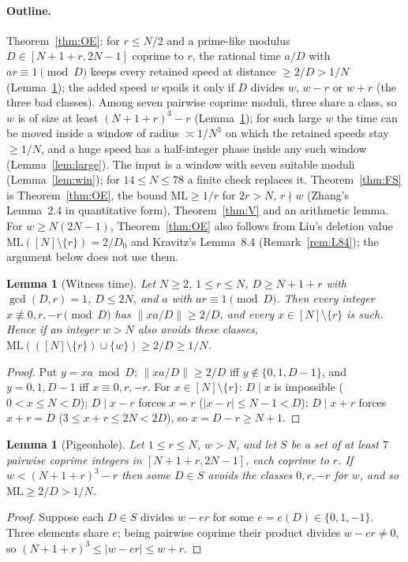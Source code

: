 \documentclass[11pt]{article}
\newtheorem{lemma}[theorem]{Lemma}
\theoremstyle{definition}
\theoremstyle{remark}
\newcommand{\nd}[1]{\lVert #1\rVert}
\newcommand{\ML}{\mathrm{ML}}
\begin{document}
\paragraph{Outline.}
Theorem~\ref{thm:OE}: for $r\le N/2$ and a prime-like modulus $D\in[N+1+r,2N-1]$ coprime to $r$, the rational time $a/D$ with $ar\equiv1\pmod D$ keeps every retained speed at distance $\ge2/D>1/N$ (Lemma~\ref{lem:wit}); the added speed $w$ spoils it only if $D$ divides $w$, $w-r$ or $w+r$ (the three bad classes). Among seven pairwise coprime moduli, three share a class, so $w$ is of size at least $(N+1+r)^3-r$ (Lemma~\ref{lem:pig}); for such large $w$ the time can be moved inside a window of radius $\asymp1/N^3$ on which the retained speeds stay $\ge1/N$, and a huge speed has a half-integer phase inside any such window (Lemma~\ref{lem:large}). The input is a window with seven suitable moduli (Lemma~\ref{lem:win}); for $14\le N\le78$ a finite check replaces it. Theorem~\ref{thm:FS} is Theorem~\ref{thm:OE}, the bound $\ML\ge1/r$ for $2r>N$, $r\nmid w$ (Zhang's Lemma~2.4 in quantitative form), Theorem~\ref{thm:V} and an arithmetic lemma. For $w\ge N(2N-1)$, Theorem~\ref{thm:OE} also follows from Liu's deletion value $\ML([N]\setminus\{r\})=2/D_0$ and Kravitz's Lemma~8.4 (Remark~\ref{rem:L84}); the argument below does not use them.

\begin{lemma}[Witness time]\label{lem:wit}
Let $N\ge2$, $1\le r\le N$, $D\ge N+1+r$ with $\gcd(D,r)=1$, $D\le2N$, and $a$ with $ar\equiv1\pmod D$. Then every integer $x\not\equiv0,r,-r\pmod D$ has $\nd{xa/D}\ge2/D$, and every $x\in[N]\setminus\{r\}$ is such. Hence if an integer $w>N$ also avoids these classes, $\ML(([N]\setminus\{r\})\cup\{w\})\ge2/D\ge1/N$.
\end{lemma}
\begin{proof}
Put $y=xa\bmod D$; $\nd{xa/D}\ge2/D$ iff $y\notin\{0,1,D-1\}$, and $y=0,1,D-1$ iff $x\equiv0,r,-r$. For $x\in[N]\setminus\{r\}$: $D\mid x$ is impossible ($0<x\le N<D$); $D\mid x-r$ forces $x=r$ ($|x-r|\le N-1<D$); $D\mid x+r$ forces $x+r=D$ ($3\le x+r\le2N<2D$), so $x=D-r\ge N+1$.
\end{proof}

\begin{lemma}[Pigeonhole]\label{lem:pig}
Let $1\le r\le N$, $w>N$, and let $S$ be a set of at least $7$ pairwise coprime integers in $[N+1+r,2N-1]$, each coprime to $r$. If $w<(N+1+r)^3-r$ then some $D\in S$ avoids the classes $0,r,-r$ for $w$, and so $\ML\ge2/D>1/N$.
\end{lemma}
\begin{proof}
Suppose each $D\in S$ divides $w-er$ for some $e=e(D)\in\{0,1,-1\}$. Three elements share $e$; being pairwise coprime their product divides $w-er\ne0$, so $(N+1+r)^3\le|w-er|\le w+r$.
\end{proof}
\end{document}
